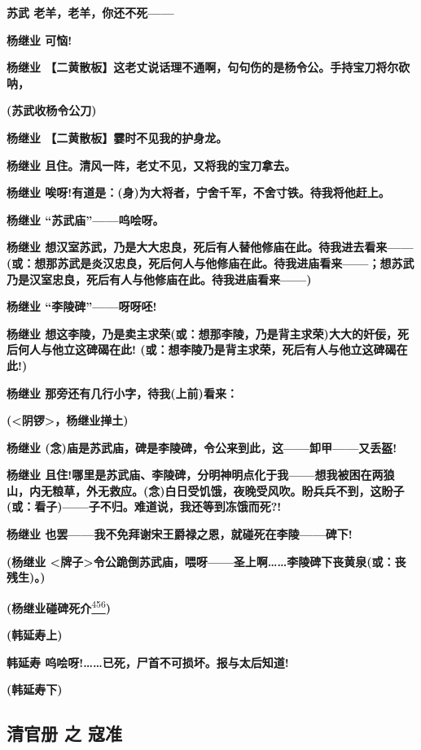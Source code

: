 \textbf{苏武 老羊，老羊，你还不死------}

\textbf{杨继业 可恼!}

\textbf{杨继业
【二黄散板】这老丈说话理不通啊，句句伤的是杨令公。手持宝刀将尔砍呐，}

\textbf{(苏武收杨令公刀)}

\textbf{杨继业 【二黄散板】霎时不见我的护身龙。　}

\textbf{杨继业 且住。清风一阵，老丈不见，又将我的宝刀拿去。}

\textbf{杨继业
唉呀!有道是：(身)为大将者，宁舍千军，不舍寸铁。待我将他赶上。}

\textbf{杨继业 ``苏武庙''------呜哙呀。}

\textbf{杨继业
想汉室苏武，乃是大大忠良，死后有人替他修庙在此。待我进去看来------(或：想那苏武是炎汉忠良，死后何人与他修庙在此。待我进庙看来------；想苏武乃是汉室忠良，死后有人与他修庙在此。待我进庙看来------)}

\textbf{杨继业 ``李陵碑''------呀呀呸!}

\textbf{杨继业
想这李陵，乃是卖主求荣(或：想那李陵，乃是背主求荣)大大的奸佞，死后何人与他立这碑碣在此!
(或：想李陵乃是背主求荣，死后有人与他立这碑碣在此!)}

\textbf{杨继业 那旁还有几行小字，待我(上前)看来：}

\textbf{(\textless{}阴锣\textgreater{}，杨继业掸土)}

\textbf{杨继业
(念)庙是苏武庙，碑是李陵碑，令公来到此，这------卸甲------又丢盔!}

\textbf{杨继业
且住!哪里是苏武庙、李陵碑，分明神明点化于我------想我被困在两狼山，内无粮草，外无救应。(念)白日受饥饿，夜晚受风吹。盼兵兵不到，这盼子(或：看子)------子不归。难道说，我还等到冻饿而死?!}

\textbf{杨继业
也罢------我不免拜谢宋王爵禄之恩，就碰死在李陵------碑下!}

\textbf{(杨继业
\textless{}牌子\textgreater{}令公跪倒苏武庙，喂呀------圣上啊\ldots{}\ldots{}李陵碑下丧黄泉(或：丧残生)。)}

\textbf{(杨继业碰碑死介}\protect\hyperlink{fn456}{\textsuperscript{456}}\textbf{)}

\textbf{(韩延寿上)}

\textbf{韩延寿 呜哙呀!\ldots{}\ldots{}已死，尸首不可损坏。报与太后知道!}

\textbf{(韩延寿下)}

\newpage
\hypertarget{ux6e05ux5b98ux518c-ux4e4b-ux5bc7ux51c6}{%
\subsection{清官册 之
寇准}\label{ux6e05ux5b98ux518c-ux4e4b-ux5bc7ux51c6}}


